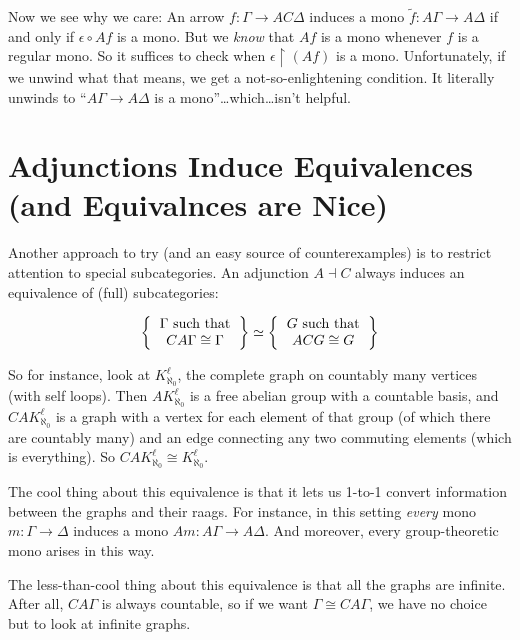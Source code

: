 \documentclass[12pt]{article}
\theoremstyle{definition}
\begin{document}
Now we see why we care: An arrow $f : \Gamma \to AC\Delta$ induces
a mono $\widetilde{f} : A\Gamma \to A\Delta$ if and only if
$\epsilon \circ Af$ is a mono. But we \emph{know} that $Af$ is a mono whenever
$f$ is a regular mono. So it suffices to check when $\epsilon \upharpoonright (Af)$
is a mono. Unfortunately, if we unwind what that means, we get a 
not-so-enlightening condition. It literally unwinds to ``$A\Gamma \to A\Delta$
is a mono''\ldots which\ldots isn't helpful.

\section{Adjunctions Induce Equivalences (and Equivalnces are Nice)}

Another approach to try (and an easy source of counterexamples) is to 
restrict attention to special subcategories. An adjunction $A \dashv C$ 
always induces an equivalence of (full) subcategories:

\[ 
  \left \{ 
    \begin{tabular}{c}
      $\Gamma$ such that\\
      $CA\Gamma \cong \Gamma$
    \end{tabular}
  \right \} 
  \simeq
  \left \{ 
    \begin{tabular}{c}
      $G$ such that\\
      $ACG \cong G$
    \end{tabular}
  \right \}
\]

So for instance, look at $K^\ell_{\aleph_0}$, the complete graph on countably
many vertices (with self loops). Then $AK^\ell_{\aleph_0}$ is a free abelian group with a countable
basis, and $CAK^\ell_{\aleph_0}$ is a graph with a vertex for each element of that 
group (of which there are countably many) and an edge connecting any two
commuting elements (which is everything). So $CAK^\ell_{\aleph_0} \cong K^\ell_{\aleph_0}$.

The cool thing about this equivalence is that it lets us 1-to-1 convert 
information between the graphs and their raags. For instance, in this setting
\emph{every} mono $m : \Gamma \to \Delta$ induces a mono 
$Am : A\Gamma \to A\Delta$. And moreover, every group-theoretic mono arises 
in this way.

The less-than-cool thing about this equivalence is that all the graphs are
infinite. After all, $CA\Gamma$ is always countable, so if we want
$\Gamma \cong CA\Gamma$, we have no choice but to look at infinite graphs.
\end{document}

